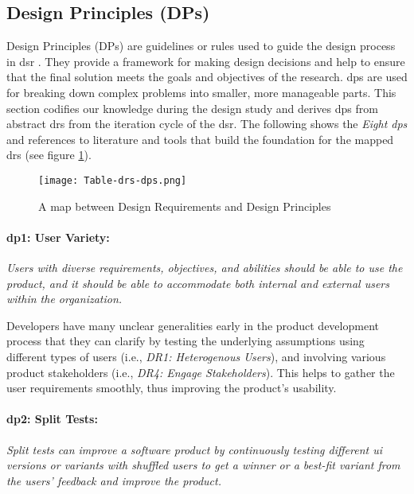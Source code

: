 \subsection{Design Principles (DPs)}
\label{design:section:designprinciple}
Design Principles (DPs) are guidelines or rules used to guide the design process in \ac{dsr} \cite{misc:dsr:henver}. 
They provide a framework for making design decisions \cite{paper:designprinciple:gregor} and help to ensure that the final solution meets the goals and objectives of the research. 
\ac{dp}s are used for breaking down complex problems into smaller, more manageable parts.
This section codifies our knowledge during the design study and derives \ac{dp}s from abstract \ac{dr}s from the iteration cycle of the \ac{dsr}.
The following shows the \textit{Eight \ac{dp}s} and references to literature and tools that build the foundation for the mapped \ac{dr}s (see figure \ref{fig:design:table-drs-dps}). 
\begin{figure}[htbp!]
  \centering    
  \texttt{[image: Table-drs-dps.png]}
  \caption[A map between \ac{dr}s and \ac{dp}s]{A map between Design Requirements and Design Principles}
  \label{fig:design:table-drs-dps}
\end{figure}

\paragraph{\ac{dp}1: User Variety:} \textit{Users with diverse requirements, objectives, and abilities should be able to use the product, and it should be able to accommodate both internal and external users within the organization.}

Developers have many unclear generalities early in the product development process \cite{misc:lean:steve} that they can clarify by testing the underlying assumptions using different types of users (i.e., \textit{DR1: Heterogenous Users}), and involving various product stakeholders (i.e., \textit{DR4: Engage Stakeholders}).
This helps to gather the user requirements smoothly, thus improving the product's usability.

\paragraph{\ac{dp}2: Split Tests:} \textit{Split tests can improve a software product by continuously testing different \ac{ui} versions or variants with shuffled users to get a winner or a best-fit variant from the users' feedback and improve the product.}

